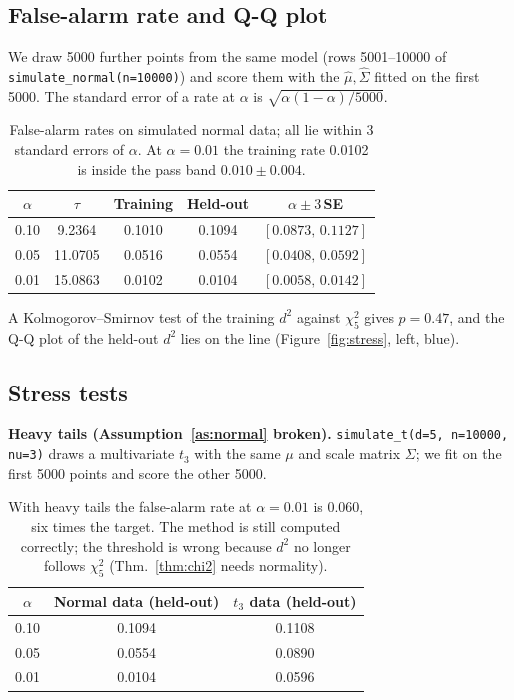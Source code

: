 \documentclass[11pt]{article}
\theoremstyle{definition}
\begin{document}
\subsection{False-alarm rate and Q-Q plot}
We draw 5000 further points from the same model (rows 5001--10000 of \texttt{simulate\_normal(n=10000)}) and score them with the $\hat\mu,\hat\Sigma$ fitted on the first 5000. The standard error of a rate at $\alpha$ is $\sqrt{\alpha(1-\alpha)/5000}$.
\begin{table}[H]
\centering
\small
\begin{tabular}{@{}ccccc@{}}
\toprule
$\alpha$ & $\tau$ & Training & Held-out & $\alpha\pm3\,$SE \\
\midrule
0.10 & 9.2364 & 0.1010 & 0.1094 & $[0.0873,\,0.1127]$ \\
0.05 & 11.0705 & 0.0516 & 0.0554 & $[0.0408,\,0.0592]$ \\
0.01 & 15.0863 & 0.0102 & 0.0104 & $[0.0058,\,0.0142]$ \\
\bottomrule
\end{tabular}
\caption{False-alarm rates on simulated normal data; all lie within 3 standard errors of $\alpha$. At $\alpha=0.01$ the training rate 0.0102 is inside the pass band $0.010\pm0.004$.}
\label{tab:simfar}
\end{table}
A Kolmogorov--Smirnov test of the training $d^2$ against $\chi^2_5$ gives $p=0.47$, and the Q-Q plot of the held-out $d^2$ lies on the line (Figure~\ref{fig:stress}, left, blue).

\subsection{Stress tests}
\textbf{Heavy tails (Assumption~\ref{as:normal} broken).} \texttt{simulate\_t(d=5, n=10000, nu=3)} draws a multivariate $t_3$ with the same $\mu$ and scale matrix $\Sigma$; we fit on the first 5000 points and score the other 5000.
\begin{table}[H]
\centering
\small
\begin{tabular}{@{}ccc@{}}
\toprule
$\alpha$ & Normal data (held-out) & $t_3$ data (held-out) \\
\midrule
0.10 & 0.1094 & 0.1108 \\
0.05 & 0.0554 & 0.0890 \\
0.01 & 0.0104 & 0.0596 \\
\bottomrule
\end{tabular}
\caption{With heavy tails the false-alarm rate at $\alpha=0.01$ is 0.060, six times the target. The method is still computed correctly; the threshold is wrong because $d^2$ no longer follows $\chi^2_5$ (Thm.~\ref{thm:chi2} needs normality).}
\label{tab:t3}
\end{table}
\end{document}
